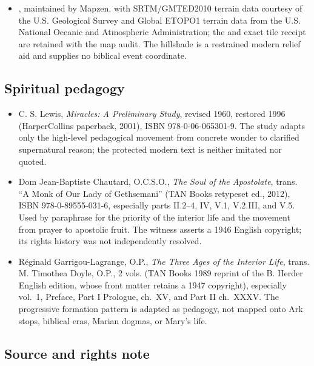 \begin{itemize}
  \item {}, maintained by Mapzen, with SRTM/GMTED2010 terrain data courtesy of the U.S. Geological Survey and Global ETOPO1 terrain data from the U.S. National Oceanic and Atmospheric Administration; the  and exact tile receipt are retained with the map audit.  The hillshade is a restrained modern relief aid and supplies no biblical event coordinate.
\end{itemize}

\subsection{Spiritual pedagogy}

\begin{itemize}
  \item C. S. Lewis, \emph{Miracles: A Preliminary Study}, revised 1960, restored 1996 (HarperCollins paperback, 2001), ISBN 978-0-06-065301-9.  The study adapts only the high-level pedagogical movement from concrete wonder to clarified supernatural reason; the protected modern text is neither imitated nor quoted.
  \item Dom Jean-Baptiste Chautard, O.C.S.O., \emph{The Soul of the Apostolate}, trans. ``A Monk of Our Lady of Gethsemani'' (TAN Books retypeset ed., 2012), ISBN 978-0-89555-031-6, especially parts II.2--4, IV, V.1, V.2.III, and V.5.  Used by paraphrase for the priority of the interior life and the movement from prayer to apostolic fruit.  The witness asserts a 1946 English copyright; its rights history was not independently resolved.
  \item Réginald Garrigou-Lagrange, O.P., \emph{The Three Ages of the Interior Life}, trans. M. Timothea Doyle, O.P., 2 vols. (TAN Books 1989 reprint of the B. Herder English edition, whose front matter retains a 1947 copyright), especially vol.~1, Preface, Part I Prologue, ch.~XV, and Part II ch.~XXXV.  The progressive formation pattern is adapted as pedagogy, not mapped onto Ark stops, biblical eras, Marian dogmas, or Mary's life.
\end{itemize}

\subsection{Source and rights note}

